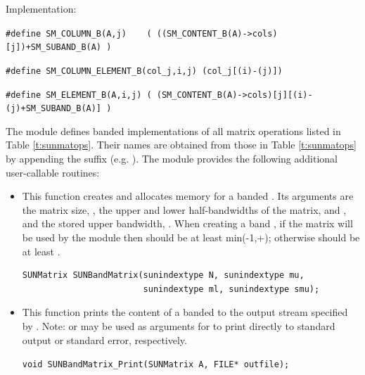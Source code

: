 \begin{itemize}
  Implementation:

  \verb|#define SM_COLUMN_B(A,j)    ( ((SM_CONTENT_B(A)->cols)[j])+SM_SUBAND_B(A) )|

  \verb|#define SM_COLUMN_ELEMENT_B(col_j,i,j) (col_j[(i)-(j)])|

  \verb|#define SM_ELEMENT_B(A,i,j) ( (SM_CONTENT_B(A)->cols)[j][(i)-(j)+SM_SUBAND_B(A)] )|

\end{itemize}
The {\sunmatband} module defines banded implementations of all matrix
operations listed in Table \ref{t:sunmatops}. Their names are obtained
from those in Table \ref{t:sunmatops} by appending the
suffix  (e.g. ). 
The module {\sunmatband} provides the following additional user-callable routines:
\begin{itemize}


\item {}

  This function creates and allocates memory for a banded .
  Its arguments are the matrix size, , the upper and lower
  half-bandwidths of the matrix,  and , and the stored
  upper bandwidth, .  When creating a band , if
  the matrix will be used by the {\sunlinsolband} module then 
  should be at least min(-1,+); otherwise 
  should be at least .  

  \begin{verbatim}
SUNMatrix SUNBandMatrix(sunindextype N, sunindextype mu,
                        sunindextype ml, sunindextype smu);
  \end{verbatim}


\item {}

  This function prints the content of a banded  to the
  output stream specified by .  Note: 
  or  may be used as arguments for  to print
  directly to standard output or standard error, respectively.
 
  \verb|void SUNBandMatrix_Print(SUNMatrix A, FILE* outfile);|



\end{itemize}
